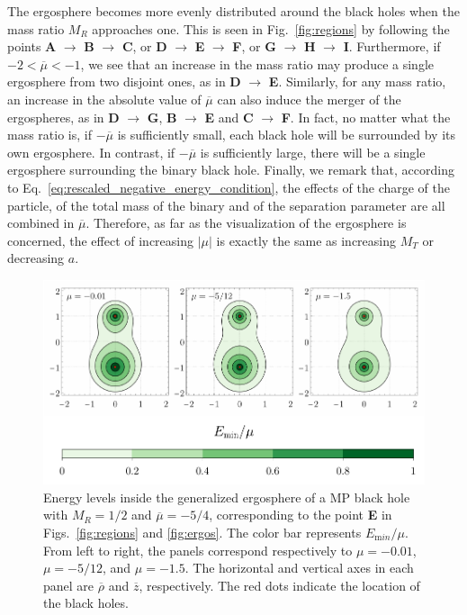 The ergosphere becomes more evenly distributed around the black holes when the mass ratio $M_R$ approaches one. This is seen in Fig.~\ref{fig:regions} by following the points \textbf{A} $\rightarrow$ \textbf{B} $\rightarrow$ \textbf{C}, or \textbf{D} $\rightarrow$ \textbf{E} $\rightarrow$ \textbf{F}, or \textbf{G} $\rightarrow$ \textbf{H} $\rightarrow$ \textbf{I}. Furthermore, if $-2 < \overline \mu < -1$, we see that an increase in the mass ratio may produce a single ergosphere from two disjoint ones, as in \textbf{D} $\rightarrow$ \textbf{E}. Similarly, for any mass ratio, an increase in the absolute value of $\overline \mu$ can also induce the merger of the ergospheres, as in \textbf{D} $\rightarrow$ \textbf{G}, \textbf{B} $\rightarrow$ \textbf{E} and \textbf{C} $\rightarrow$ \textbf{F}. In fact, no matter what the mass ratio is, if $-\overline \mu$ is sufficiently small, each black hole will be surrounded by its own ergosphere. In contrast, if $-\overline \mu$ is sufficiently large, there will be a single ergosphere surrounding the binary black hole. Finally, we remark that, according to Eq.~\eqref{eq:rescaled_negative_energy_condition}, the effects of the charge of the particle, of the total mass of the binary and of the separation parameter are all combined in $\overline \mu$. Therefore, as far as the visualization of the ergosphere is concerned, the effect of increasing $|\mu|$ is exactly the same as increasing $M_T$ or decreasing $a$.

\begin{figure}[!ht]
  \centering
  \includegraphics[width=\linewidth]{img/penrose_binaries/fig3.pdf}
  \caption{Energy levels inside the generalized ergosphere of a \ac{MP} black hole with $M_R=1/2$ and $\overline \mu = -5/4$, corresponding to the point \textbf{E} in Figs.~\ref{fig:regions} and \ref{fig:ergos}. The color bar represents $E_{\mathrm min}/\mu$. From left to right, the panels correspond respectively to $\mu=-0.01$, $\mu=-5/12$, and $\mu=-1.5$. The horizontal and vertical axes in each panel are $\overline \rho$ and $\overline z$, respectively. The red dots indicate the location of the black holes.}
  \label{fig:energylevels}
\end{figure}

